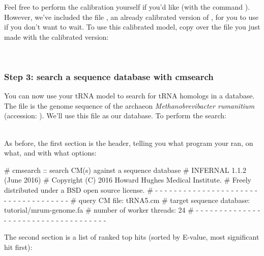 Feel free to perform the calibration yourself if you'd like (with the
command ). However, we've included the file
, an already calibrated version of ,
for you to use if you don't want to wait. To use this calibrated
model, copy over the  file you just made with the
calibrated version:
 
\\
 
\subsubsection{Step 3: search a sequence database with cmsearch}

You can now use your tRNA model to search for tRNA homologs in a
database. The file  is the genome sequence of the
archaeon \emph{Methanobrevibacter rumanitium} (accession:
). We'll use this file as our database. To perform
the search:

\\

As before, the first section is the header, telling you what program
your ran, on what, and with what options:

\begin{sreoutput}
# cmsearch :: search CM(s) against a sequence database
# INFERNAL 1.1.2 (June 2016)
# Copyright (C) 2016 Howard Hughes Medical Institute.
# Freely distributed under a BSD open source license.
# - - - - - - - - - - - - - - - - - - - - - - - - - - - - - - - - - - - -
# query CM file:                         tRNA5.cm
# target sequence database:              tutorial/mrum-genome.fa
# number of worker threads:              24
# - - - - - - - - - - - - - - - - - - - - - - - - - - - - - - - - - - - -
\end{sreoutput}

The second section is a list of ranked top hits (sorted by E-value,
most significant hit first):

